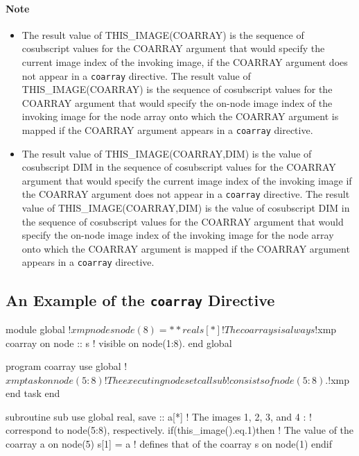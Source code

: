 \paragraph*{Note}
\begin{itemize}
 \item 
       The result value of THIS\_IMAGE(COARRAY)
       is the sequence of cosubscript
       values for the COARRAY argument that would specify the current image index of
       the invoking image, if the COARRAY argument does not appear in a
       {\tt coarray} directive.
       The result value of THIS\_IMAGE(COARRAY)
       is the sequence of cosubscript
       values for the COARRAY argument that would specify the on-node image index of the invoking image
for the node array onto which the COARRAY argument is mapped
       if the COARRAY argument appears in a {\tt coarray} directive.	      

 \item 

       The result value of THIS\_IMAGE(COARRAY,DIM) is
       the value
       of cosubscript DIM in the sequence of cosubscript values
       for the COARRAY argument that would specify the current image index of
       the invoking image if the COARRAY argument does not appear in a
       {\tt coarray} directive.
       The result value of THIS\_IMAGE(COARRAY,DIM) is
       the value
       of cosubscript DIM in the sequence of cosubscript values
       for the COARRAY argument that would specify the on-node image index of
       the invoking image for the node array
       onto which the COARRAY argument is mapped
       if the COARRAY argument appears in a {\tt coarray}
       directive.
\end{itemize}


\subsection{An Example of the {\tt coarray} Directive}


\begin{XFexample}
      module global
!$xmp nodes node(8)=**    
      real s[*]             ! The coarray s is always 
!$xmp coarray on node :: s  ! visible on node(1:8).
      end global

      program coarray
      use global
!$xmp task on node(5:8)     ! The executing node set 
        call sub            ! consists of node(5:8).
!$xmp end task
      end

      subroutine sub
      use global
      real, save :: a[*]    ! The images 1, 2, 3, and 4 
         :                  ! correspond to node(5:8), respectively.
      if(this_image().eq.1)then ! The value of the coarray a on node(5) 
         s[1] = a               ! defines that of the coarray s on node(1)
      endif
\end{XFexample}


